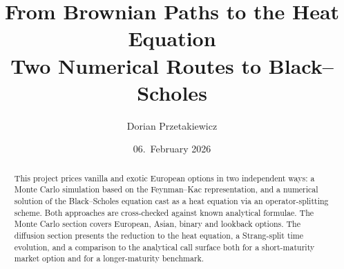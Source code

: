 \documentclass[11pt]{article}
\title{\vspace{-1cm}\textbf{From Brownian Paths to the Heat Equation}\\[0.3em]
       \large Two Numerical Routes to Black--Scholes}
\author{Dorian Przetakiewicz}
\date{06.\ February 2026}
\begin{document}
\begin{titlepage}
\maketitle
\thispagestyle{empty}
\vspace{2em}
\begin{abstract}
\noindent
This project prices vanilla and exotic European options in two independent ways: a Monte Carlo simulation based on the Feynman--Kac representation, and a numerical solution of the Black--Scholes equation cast as a heat equation via an operator-splitting scheme. Both approaches are cross-checked against known analytical formulae. The Monte Carlo section covers European, Asian, binary and lookback options. The diffusion section presents the reduction to the heat equation, a Strang-split time evolution, and a comparison to the analytical call surface both for a short-maturity market option and for a longer-maturity benchmark.
\end{abstract}
\end{titlepage}

\tableofcontents
\clearpage
{}
\setcounter{page}{1}
\end{document}
